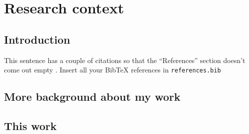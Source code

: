 \documentclass[11pt]{book}
\begin{document}
\blindtext


\newpage
{}

\blindtext
\mainmatter           %
\setcounter{table}{0} %



%
%
\part{Research context}



\setcounter{page}{1}  %
\chapter{Introduction}

This sentence has a couple of citations so that the ``References'' section doesn't come out empty \citep{Carrera_2015,Carrera_2016}. Insert all your BibTeX references in \texttt{references.bib}

\blindtext



\chapter{More background about my work}


\blindtext



\chapter{This work}


\blindtext
\end{document}
